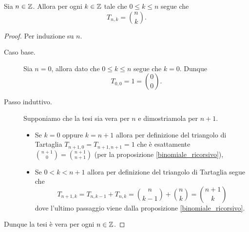 \begin{proposition}
    Sia $n \in \mathbb{Z}$. Allora per ogni $k \in \mathbb{Z}$ tale che $0 \leq k \leq n$ segue che \begin{equation}
        T_{n,k} = \binom{n}{k}.
    \end{equation}
\end{proposition}
\begin{proof}
    Per induzione su $n$.
    \begin{description}
        \item[Caso base.]

        Sia $n = 0$, allora dato che $0 \leq k \leq n$ segue che $k = 0$. Dunque
        \[
            T_{0, 0} = 1 = \binom{0}{0}.    
        \]
        \item[Passo induttivo.]
        
        Supponiamo che la tesi sia vera per $n$ e dimostriamola per $n+1$. 
        \begin{itemize}
            \item Se $k = 0$ oppure $k = n + 1$ allora per definizione del triangolo di Tartaglia $T_{n+1, 0} = T_{n+1, n+1} = 1$ che è esattamente $\binom{n+1}{0} = \binom{n+1}{n+1}$ (per la proposizione \ref{binomiale_ricorsivo}),
            \item Se $0 < k < n+1$ allora per definizione del triangolo di Tartaglia segue che \[
                T_{n+1, k} = T_{n, k-1} + T_{n, k} = \binom{n}{k-1} + \binom{n}{k} = \binom{n+1}{k}    
            \] dove l'ultimo passaggio viene dalla proposizione \ref{binomiale_ricorsivo}.
        \end{itemize}
    \end{description}
    Dunque la tesi è vera per ogni $n \in \mathbb{Z}$.
\end{proof}

